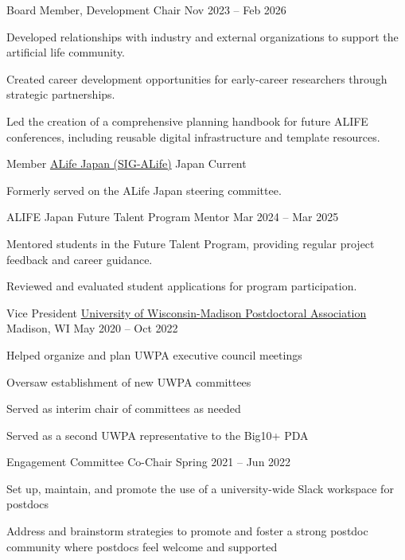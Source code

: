 \begin{cventries}
\cvsubposition
  {Board Member, Development Chair}
  {Nov 2023 -- Feb 2026}
  {
    \begin{cvitems}
      \item {Developed relationships with industry and external organizations to support the artificial life community.}
      \item {Created career development opportunities for early-career researchers through strategic partnerships.}
      \item {Led the creation of a comprehensive planning handbook for future ALIFE conferences, including reusable digital infrastructure and template resources.}
    \end{cvitems}
  }
  
\cventry
  {Member}
  {\href{https://www.alife-japan.org/}{ALife Japan (SIG-ALife)}}
  {Japan}
  {Current}
  {
    \begin{cvitems}
      \item {Formerly served on the ALife Japan steering committee.}
    \end{cvitems}
  }

\cvsubposition
  {ALIFE Japan Future Talent Program Mentor}
  {Mar 2024 -- Mar 2025}
  {
    \begin{cvitems}
      \item {Mentored students in the Future Talent Program, providing regular project feedback and career guidance.}
      \item {Reviewed and evaluated student applications for program participation.}
    \end{cvitems}
  }

\cventry
    {Vice President}
    {\href{https://uwpa.wisc.edu/}{University of Wisconsin-Madison Postdoctoral Association}}
    {Madison, WI}
    {May 2020 -- Oct 2022}
    {
    \begin{cvitems}
        \item {Helped organize and plan UWPA executive council meetings}
        \item {Oversaw establishment of new UWPA committees}
        \item {Served as interim chair of committees as needed}
        \item {Served as a second UWPA representative to the Big10+ PDA}
     \end{cvitems}
    }

\cvsubposition
    {Engagement Committee Co-Chair}
    {Spring 2021 -- Jun 2022}
    {
    \begin{cvitems}
        \item {Set up, maintain, and promote the use of a university-wide Slack workspace for postdocs}
        \item {Address and brainstorm strategies to promote and foster a strong postdoc community where postdocs feel welcome and supported}
     \end{cvitems}
    }


\end{cventries}
